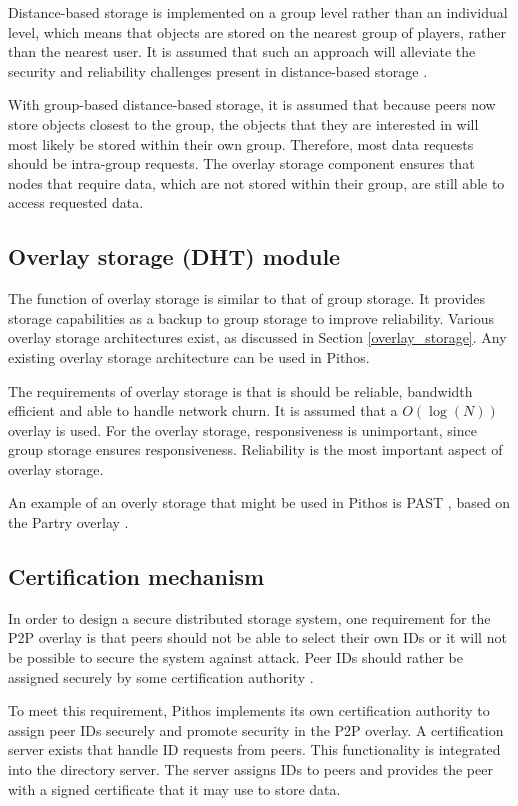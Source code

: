 Distance-based storage is implemented on a group level rather than an individual level, which means that objects are stored on the nearest group of players, rather than the nearest user. It is assumed that such an approach will alleviate the security and reliability challenges present in distance-based storage \cite{gilmore_p2p_mmog_state_persistency}.

With group-based distance-based storage, it is assumed that because peers now store objects closest to the group, the objects that they are interested in will most likely be stored within their own group. Therefore, most data requests should be intra-group requests. The overlay storage component ensures that nodes that require data, which are not stored within their group, are still able to access requested data.

\subsection{Overlay storage (DHT) module}

The function of overlay storage is similar to that of group storage. It provides storage capabilities as a backup to group storage to improve reliability. Various overlay storage architectures exist, as discussed in Section \ref{overlay_storage}. Any existing overlay storage architecture can be used in Pithos.

The requirements of overlay storage is that is should be reliable, bandwidth efficient and able to handle network churn. It is assumed that a $O(\log(N))$ overlay is used. For the overlay storage, responsiveness is unimportant, since group storage ensures responsiveness. Reliability is the most important aspect of overlay storage.

An example of an overly storage that might be used in Pithos is PAST \cite{PAST_storage}, based on the Partry overlay \cite{pastry}.

\subsection{Certification mechanism}

In order to design a secure distributed storage system, one requirement for the P2P overlay is that peers should not be able to select their own IDs or it will not be possible to secure the system against attack. Peer IDs should rather be assigned securely by some certification authority \cite{secure_overlay_routing}.

To meet this requirement, Pithos implements its own certification authority to assign peer IDs securely and promote security in the P2P overlay. A certification server exists that handle ID requests from peers. This functionality is integrated into the directory server. The server assigns IDs to peers and provides the peer with a signed certificate that it may use to store data.

